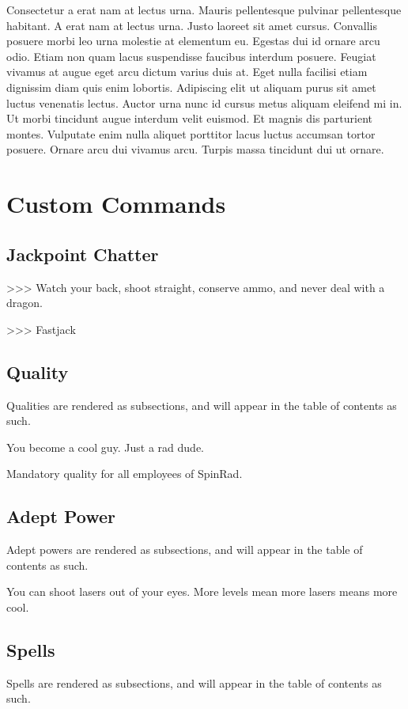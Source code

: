 \documentclass[red, openany, logo-1e]{shadowrun}
\begin{document}
Consectetur a erat nam at lectus urna. Mauris pellentesque pulvinar pellentesque habitant. A erat nam at lectus urna. Justo laoreet sit amet cursus. Convallis posuere morbi leo urna molestie at elementum eu. Egestas dui id ornare arcu odio. Etiam non quam lacus suspendisse faucibus interdum posuere. Feugiat vivamus at augue eget arcu dictum varius duis at. Eget nulla facilisi etiam dignissim diam quis enim lobortis. Adipiscing elit ut aliquam purus sit amet luctus venenatis lectus. Auctor urna nunc id cursus metus aliquam eleifend mi in. Ut morbi tincidunt augue interdum velit euismod. Et magnis dis parturient montes. Vulputate enim nulla aliquet porttitor lacus luctus accumsan tortor posuere. Ornare arcu dui vivamus arcu. Turpis massa tincidunt dui ut ornare.

\chapter{Custom Commands}

\section{Jackpoint Chatter}
\begin{chatter}
    >>> Watch your back, shoot straight, conserve ammo, and never deal with a dragon.

    >>> Fastjack
\end{chatter}

\section{Quality}
Qualities are rendered as subsections, and will appear in the table of contents as such.

{
    You become a cool guy. Just a rad dude.

    Mandatory quality for all employees of SpinRad.
}

\section{Adept Power}
Adept powers are rendered as subsections, and will appear in the table of contents as such.

{
    You can shoot lasers out of your eyes. More levels mean more lasers means more cool.
}

\section{Spells}
Spells are rendered as subsections, and will appear in the table of contents as such.
\end{document}

